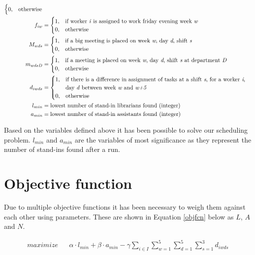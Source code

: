 \begin{align}
\begin{cases}
 		0, & \text{otherwise}
	\end{cases}
	\\
	f_{iw}&=
	\begin{cases}
 		1, & \text{if worker \textit{i} is assigned to work friday evening week \textit{w}} \\
 		0, & \text{otherwise}
	\end{cases}	
	\\
	M_{wds}&=
	\begin{cases}
	 	1, & \text{if a big meeting is placed on week \textit{w}, day \textit{d}, shift \textit{s}} \\
	 	0, & \text{otherwise}
	\end{cases}
	\\
	m_{wdsD}&=
	\begin{cases}
	 	1, & \text{if a meeting is placed on week \textit{w}, day \textit{d}, shift \textit{s} at department \textit{D}} \\
	 	0, & \text{otherwise}
	\end{cases}
	\\
	d_{iwds}&=
	\begin{cases}
	 	1, & \text{if there is a difference in assignment of tasks at a shift \textit{s}, for a worker \textit{i},}\\
	 		& \text{day \textit{d} between week \textit{w} and \textit{w+5}} \\
	 	0, & \text{otherwise}
	\end{cases}
	\\
	l_{min}&= \text{lowest number of stand-in librarians found (integer)} \\
	a_{min}&= \text{lowest number of stand-in assistants found (integer)}
\end{align}

Based on the variables defined above it has been possible to solve our scheduling problem. \textit{$l_{min}$} and \textit{$a_{min}$} are the variables of most significance as they represent the number of stand-ins found after a run. 

\section{Objective function} \label{section:obj}
Due to multiple objective functions it has been necessary to weigh them against each other using parameters. These are shown in Equation \ref{objfcn} below as $L$, $A$ and $N$.

\begin{equation} 
\begin{aligned}
 maximize & & \alpha \cdot l_{min} + \beta \cdot a_{min} - \gamma \sum_{i \in I}\sum_{w = 1}^{5}\sum_{d = 1}^{5}\sum_{s = 1}^{3} d_{iwds}    \label{objfcn}
\end{aligned}
\end{equation}

